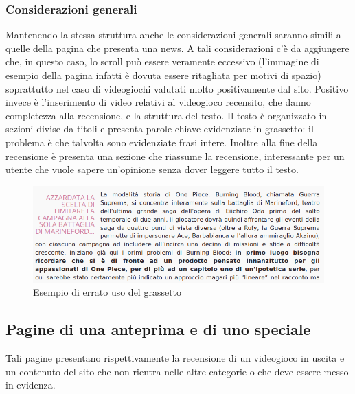 \documentclass[../ProgettoTecWeb2.tex]{subfiles}
\begin{document}
		\subsubsection{Considerazioni generali}
		Mantenendo la stessa struttura anche le considerazioni generali saranno simili a quelle della pagina che presenta una news. A tali considerazioni c'è da aggiungere che, in questo caso, lo scroll può essere veramente eccessivo (l'immagine di esempio della pagina infatti è dovuta essere ritagliata per motivi di spazio) soprattutto nel caso di videogiochi valutati molto positivamente dal sito. Positivo invece è l'inserimento di video relativi al videogioco recensito, che danno completezza alla recensione, e la struttura del testo. Il testo è organizzato in sezioni divise da titoli e presenta parole chiave evidenziate in grassetto: il problema è che talvolta sono evidenziate frasi intere. Inoltre alla fine della recensione è presenta una sezione che riassume la recensione, interessante per un utente che vuole sapere un'opinione senza dover leggere tutto il testo.
		\begin{figure} [H]
			\centering
			\includegraphics[scale=0.4]{img/ErratoUsoGrassetto}
			\caption{Esempio di errato uso del grassetto}
		\end{figure}

	\subsection{Pagine di una anteprima e di uno speciale}
	Tali pagine presentano rispettivamente la recensione di un videogioco in uscita e un contenuto del sito che non rientra nelle altre categorie o che deve essere messo in evidenza.
\end{document}
